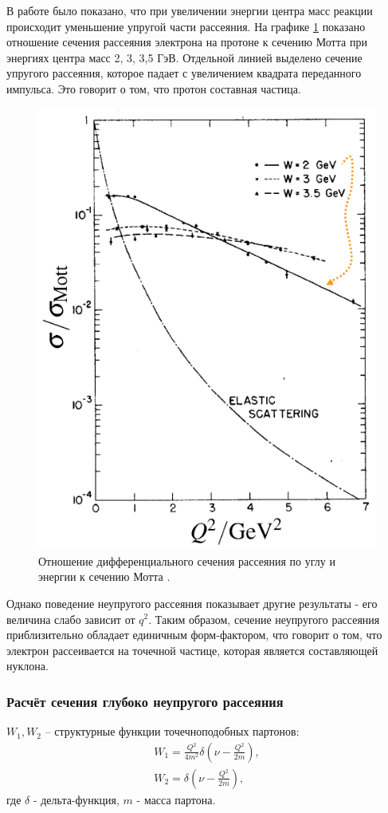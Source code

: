 \documentclass{extarticle}
\begin{document}
В работе \cite{Breidenbach} было показано, что при увеличении энергии центра масс реакции происходит уменьшение упругой части рассеяния. На графике \ref{fig:Mott} показано отношение сечения рассеяния электрона на протоне к сечению Мотта при энергиях центра масс 2, 3, 3,5 ГэВ. Отдельной линией выделено сечение упругого рассеяния, которое падает с увеличением квадрата переданного импульса. Это говорит о том, что протон составная частица. 
\begin{figure}[h]
    \centering
    \includegraphics[width = 0.6\linewidth]{Mott.png}
    \caption{Отношение дифференциального сечения рассеяния по углу и энергии к сечению Мотта \cite{Breidenbach}.}
    \label{fig:Mott}
\end{figure}

Однако поведение неупругого рассеяния показывает другие результаты - его величина слабо зависит от $q^2$. Таким образом, сечение неупругого рассеяния приблизительно обладает единичным форм-фактором, что говорит о том, что электрон рассеивается на точечной частице, которая является составляющей нуклона.

\subsubsection{Расчёт сечения глубоко неупругого рассеяния}



$W_1, W_2$ -- структурные функции точечноподобных партонов:
\begin{equation}
\begin{split}
	W_1  =   \frac{Q^2}{4m^2} \delta(\nu - \frac{Q^2}{2m}), \\
	W_2  =  \delta(\nu - \frac{Q^2}{2m}),
\end{split}
	\label{eq:deltastruct}
\end{equation}
где $\delta$ - дельта-функция, $m$ - масса партона.
\end{document}
